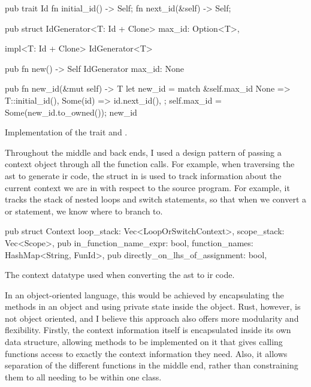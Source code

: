 \documentclass[00-main.tex]{subfiles}
\begin{document}
\begin{listing}[!ht]
  \begin{RustListing}
    pub trait Id {
        fn initial_id() -> Self;
        fn next_id(&self) -> Self;
    }

    pub struct IdGenerator<T: Id + Clone> {
        max_id: Option<T>,
    }

    impl<T: Id + Clone> IdGenerator<T> {
        pub fn new() -> Self {
            IdGenerator { max_id: None }
        }

        pub fn new_id(&mut self) -> T {
            let new_id = match &self.max_id {
                None => T::initial_id(),
                Some(id) => id.next_id(),
            };
            self.max_id = Some(new_id.to_owned());
            new_id
        }
    }
  \end{RustListing}
  \caption{Implementation of the  trait and .}
  \label{lst:Id and IdGenerator implementation}
\end{listing}

Throughout the middle and back ends, I used a design pattern of passing a context object through all the function calls.
For example, when traversing the \gls{ast} to generate \gls{ir} code, the  struct in  is used to track information about the current context we are in with respect to the source program.
For example, it tracks the stack of nested loops and switch statements, so that when we convert a  or  statement, we know where to branch to.

\begin{listing}[!ht]
  \begin{RustListing}
    pub struct Context {
        loop_stack: Vec<LoopOrSwitchContext>,
        scope_stack: Vec<Scope>,
        pub in_function_name_expr: bool,
        function_names: HashMap<String, FunId>,
        pub directly_on_lhs_of_assignment: bool,
    }
  \end{RustListing}
  \caption{The context datatype used when converting the \gls{ast} to \gls{ir} code.}
  \label{lst:AST to IR context struct}
\end{listing}

In an object-oriented language, this would be achieved by encapsulating the methods in an object and using private state inside the object.
Rust, however, is not object oriented, and I believe this approach also offers more modularity and flexibility.
Firstly, the context information itself is encapsulated inside its own data structure, allowing methods to be implemented on it that gives calling functions access to exactly the context information they need.
Also, it allows separation of the different functions in the middle end, rather than constraining them to all needing to be within one class.
\end{document}
